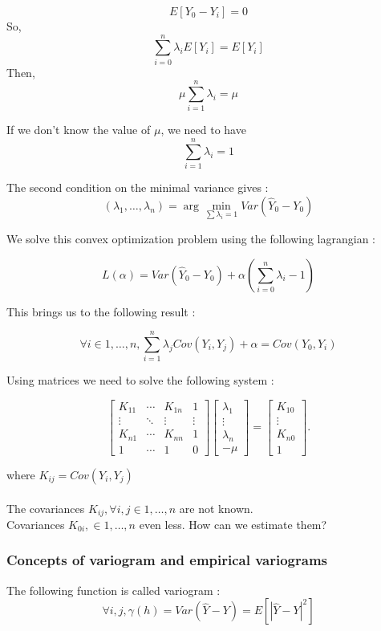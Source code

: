 \documentclass[hidelinks,12pt]{article}
\begin{document}
$$E[Y_0-Y_i]=0$$
So, $$\sum_{i=0}^{n}\lambda_iE[Y_i]=E[Y_i]$$
Then, $$\mu \sum_{i=1}^{n}\lambda_i = \mu$$

If we don't know the value of $\mu$, we need to have $$\sum_{i=1}^{n}\lambda_i=1$$

The second condition on the minimal variance gives : 
$$ (\lambda_1,\ldots,\lambda_n)= \arg\min_{\sum \lambda_i=1} Var(\hat{Y}_0-Y_0)$$

We solve this convex optimization problem using the following lagrangian :

$$L(\alpha)=Var(\hat{Y}_0-Y_0)+\alpha(\sum_{i=0}^{n}\lambda_i-1)$$

This brings us to the following result :

$$\forall i \in {1,\ldots, n}, \sum_{i=1}^{n}\lambda_j Cov(Y_i,Y_j)+ \alpha = Cov(Y_0,Y_i)$$

Using matrices we need to solve the following system :

$$
\begin{bmatrix}
K_{11}& \cdots  & K_{1n} & 1\\ \vdots & \ddots & \vdots & \vdots \\ K_{n1} & \cdots  & K_{nn} & 1 \\ 1 & \cdots & 1 & 0 
\end{bmatrix} 
\begin{bmatrix}
\lambda_1 \\ \vdots \\ \lambda_n \\ - \mu 
\end{bmatrix} = 
\begin{bmatrix} K_{10} \\ \vdots \\ K_{n0} \\ 1
\end{bmatrix}.$$

where $K_{ij}=Cov(Y_i,Y_j)$
\\\\
The covariances $K_{ij}, \forall i,j\in {1,\ldots,n}$ are not known.
\\
Covariances $K_{0i}, \in {1,\ldots,n}$ even less. How can we estimate them?

\subsubsection{Concepts of variogram and empirical variograms}

The following function is called variogram : $$\forall i,j, \gamma(h)=Var(\hat{Y}-Y)=E[|\hat{Y}-Y|^2]$$
\end{document}
